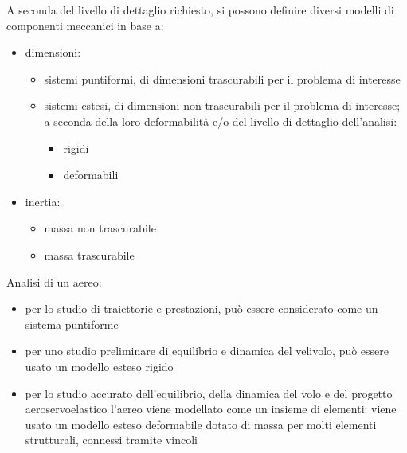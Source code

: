 \documentclass[letterpaper,10pt,italian]{jupyterBook}
\begin{document}
\sphinxAtStartPar
A seconda del livello di dettaglio richiesto, si possono definire diversi modelli di componenti meccanici in base a:
\begin{itemize}
\item {} 
\sphinxAtStartPar
dimensioni:
\begin{itemize}
\item {} 
\sphinxAtStartPar
sistemi puntiformi, di dimensioni trascurabili per il problema di interesse

\item {} 
\sphinxAtStartPar
sistemi estesi, di dimensioni non trascurabili per il problema di interesse; a seconda della loro deformabilità e/o del livello di dettaglio dell’analisi:
\begin{itemize}
\item {} 
\sphinxAtStartPar
rigidi

\item {} 
\sphinxAtStartPar
deformabili

\end{itemize}

\end{itemize}

\item {} 
\sphinxAtStartPar
inertia:
\begin{itemize}
\item {} 
\sphinxAtStartPar
massa non trascurabile

\item {} 
\sphinxAtStartPar
massa trascurabile

\end{itemize}

\end{itemize}

\sphinxAtStartPar
{} Analisi di un aereo:
\begin{itemize}
\item {} 
\sphinxAtStartPar
per lo studio di traiettorie e prestazioni, può essere considerato come un sistema puntiforme

\item {} 
\sphinxAtStartPar
per uno studio preliminare di equilibrio e dinamica del velivolo, può essere usato un modello esteso rigido

\item {} 
\sphinxAtStartPar
per lo studio accurato dell’equilibrio, della dinamica del volo e del progetto aero\sphinxhyphen{}servo\sphinxhyphen{}elastico l’aereo viene modellato come un insieme di elementi: viene usato un modello esteso deformabile dotato di massa per molti elementi strutturali, connessi tramite vincoli

\end{itemize}
\end{document}
